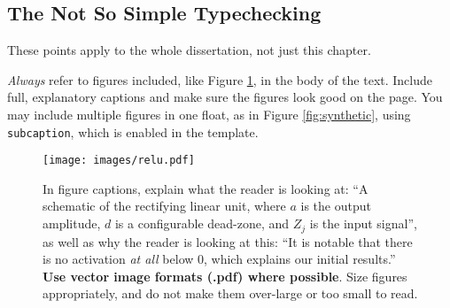 \documentclass{l4proj}
\begin{document}
\subsection{The Not So Simple Typechecking}





These points apply to the whole dissertation, not just this chapter.



\emph{Always} refer to figures included, like Figure \ref{fig:relu}, in the body of the text. Include full, explanatory captions and make sure the figures look good on the page.
You may include multiple figures in one float, as in Figure \ref{fig:synthetic}, using \texttt{subcaption}, which is enabled in the template.



\begin{figure}
    \centering
    \texttt{[image: images/relu.pdf]}    

    \caption{In figure captions, explain what the reader is looking at: ``A schematic of the rectifying linear unit, where $a$ is the output amplitude,
    $d$ is a configurable dead-zone, and $Z_j$ is the input signal'', as well as why the reader is looking at this: 
    ``It is notable that there is no activation \emph{at all} below 0, which explains our initial results.'' 
    \textbf{Use vector image formats (.pdf) where possible}. Size figures appropriately, and do not make them over-large or too small to read.
    }

    \label{fig:relu} 
\end{figure}
\end{document}
